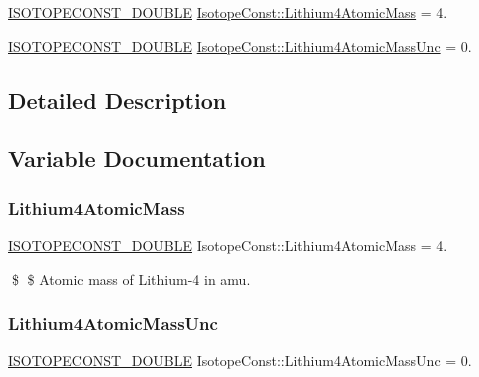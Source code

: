 \begin{DoxyCompactItemize}
\item 
\mbox{\hyperlink{group___isotope_const-_macros_ga8f45a7272ce02c0b4c65c44636ed719a}{I\+S\+O\+T\+O\+P\+E\+C\+O\+N\+S\+T\+\_\+\+D\+O\+U\+B\+LE}} \mbox{\hyperlink{group___isotope_const-_lithium-_li4_ga5268be61d192ffb22a6686fa73f5c07a}{Isotope\+Const\+::\+Lithium4\+Atomic\+Mass}} = 4.
\item 
\mbox{\hyperlink{group___isotope_const-_macros_ga8f45a7272ce02c0b4c65c44636ed719a}{I\+S\+O\+T\+O\+P\+E\+C\+O\+N\+S\+T\+\_\+\+D\+O\+U\+B\+LE}} \mbox{\hyperlink{group___isotope_const-_lithium-_li4_gaf7dca5ed8d77cde327e4c9783be23257}{Isotope\+Const\+::\+Lithium4\+Atomic\+Mass\+Unc}} = 0.
\end{DoxyCompactItemize}


\subsection{Detailed Description}


\subsection{Variable Documentation}
\mbox{\label{group___isotope_const-_lithium-_li4_ga5268be61d192ffb22a6686fa73f5c07a}} 
\subsubsection{\texorpdfstring{Lithium4\+Atomic\+Mass}{Lithium4AtomicMass}}
{\footnotesize\ttfamily \mbox{\hyperlink{group___isotope_const-_macros_ga8f45a7272ce02c0b4c65c44636ed719a}{I\+S\+O\+T\+O\+P\+E\+C\+O\+N\+S\+T\+\_\+\+D\+O\+U\+B\+LE}} Isotope\+Const\+::\+Lithium4\+Atomic\+Mass = 4.}

\$ \$ Atomic mass of Lithium-\/4 in amu. \mbox{\label{group___isotope_const-_lithium-_li4_gaf7dca5ed8d77cde327e4c9783be23257}} 
\subsubsection{\texorpdfstring{Lithium4\+Atomic\+Mass\+Unc}{Lithium4AtomicMassUnc}}
{\footnotesize\ttfamily \mbox{\hyperlink{group___isotope_const-_macros_ga8f45a7272ce02c0b4c65c44636ed719a}{I\+S\+O\+T\+O\+P\+E\+C\+O\+N\+S\+T\+\_\+\+D\+O\+U\+B\+LE}} Isotope\+Const\+::\+Lithium4\+Atomic\+Mass\+Unc = 0.}

